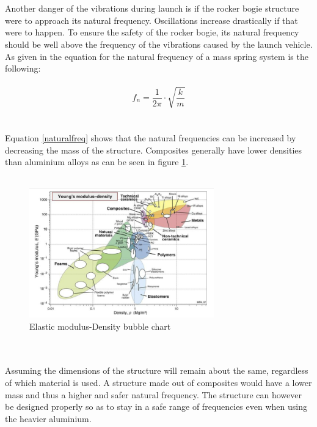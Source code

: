 \\
\\
Another danger of the vibrations during launch is if the rocker bogie structure were to approach its natural frequency. Oscillations increase drastically if that were to happen. To ensure the safety of the rocker bogie, its natural frequency should be well above the frequency of the vibrations caused by the launch vehicle. As given in \cite{Introduction-to-Aerospace-Structures-and-Materials} the equation for the natural frequency of a mass spring system is the following:
\\
\\
\begin{equation} \label{naturalfreq}
    f_n= \frac{1}{2\pi} \cdot \sqrt{\frac{k}{m}}
\end{equation}
\\
\\ 
Equation \ref{naturalfreq} shows that the natural frequencies can be increased by decreasing the mass of the structure. Composites generally have lower densities than aluminium alloys as can be seen in figure \ref{bubblechart}.
\\
\\
\begin{figure}
    \centering
    \includegraphics[width=8cm]{figures/Bubble chart.png}
    \caption{Elastic modulus-Density bubble chart \cite{ashby-aerospace-materials}}
    \label{bubblechart}
\end{figure}
\\
\\
Assuming the dimensions of the structure will remain about the same, regardless of which material is used. A structure made out of composites would have a lower mass and thus a higher and safer natural frequency. The structure can however be designed properly so as to stay in a safe range of frequencies even when using the heavier aluminium.
\\
\\
